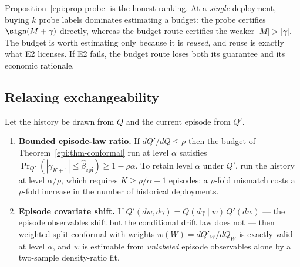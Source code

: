 \begin{remark}
Proposition~\ref{epi:prop-probe} is the honest ranking. At a \emph{single} deployment, buying
$k$ probe labels dominates estimating a budget: the probe certifies $\sign(M+\gamma)$ directly,
whereas the budget route certifies the weaker $|M|>|\gamma|$. The budget is worth estimating only
because it is \emph{reused}, and reuse is exactly what E2 licenses. If E2 fails, the budget route
loses both its guarantee and its economic rationale.
\end{remark}

\subsection{Relaxing exchangeability}

\begin{theorem}\label{epi:thm-shift}
Let the history be drawn from $Q$ and the current episode from $Q'$.
\begin{enumerate}
\item[\textnormal{(a)}] \textbf{Bounded episode-law ratio.} If $dQ'/dQ\le\rho$ then the budget of
Theorem~\ref{epi:thm-conformal} run at level $\alpha$ satisfies
$\Pr_{Q'}(|\gamma_{K+1}|\le\widehat\beta_{\mathrm{epi}})\ge1-\rho\alpha$. To retain level $\alpha$
under $Q'$, run the history at level $\alpha/\rho$, which requires $K\ge\rho/\alpha-1$ episodes: a
$\rho$-fold mismatch costs a $\rho$-fold increase in the number of historical deployments.
\item[\textnormal{(b)}] \textbf{Episode covariate shift.} If $Q'(dw,d\gamma)=Q(d\gamma\mid w)\,Q'(dw)$
--- the episode observables shift but the conditional drift law does not --- then weighted split
conformal with weights $w(W)=dQ'_W/dQ_W$ is exactly valid at level $\alpha$, and $w$ is estimable
from \emph{unlabeled} episode observables alone by a two-sample density-ratio fit.
\end{enumerate}
\end{theorem}

